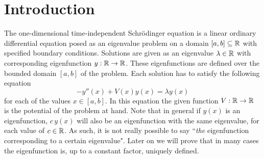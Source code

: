 

\label{cha:c2}

\section{Introduction}

The one-dimensional time-independent Schrödinger equation is a linear ordinary differential equation posed as an eigenvalue problem on a domain $[a, b] \subseteq \mathbb{R}$ with specified boundary conditions. Solutions are given as an eigenvalue $\lambda \in \mathbb{R}$ with corresponding eigenfunction $y: \mathbb{R} \to \mathbb{R}$. These eigenfunctions are defined over the bounded domain $[a, b]$ of the problem. Each solution has to satisfy the following equation
$$
    -y''(x) + V(x)y(x) = \lambda y(x)
$$
for each of the values $x\in [a, b]$. In this equation the given function $V: \mathbb{R} \to \mathbb{R}$ is the potential of the problem at hand. Note that in general if $y(x)$ is an eigenfunction, $c\,y(x)$ will also be an eigenfunction with the same eigenvalue, for each value of $c \in \mathbb{R}$. As such, it is not really possible to say ``\emph{the} eigenfunction corresponding to a certain eigenvalue". Later on we will prove that in many cases the eigenfunction is, up to a constant factor, uniquely defined.

